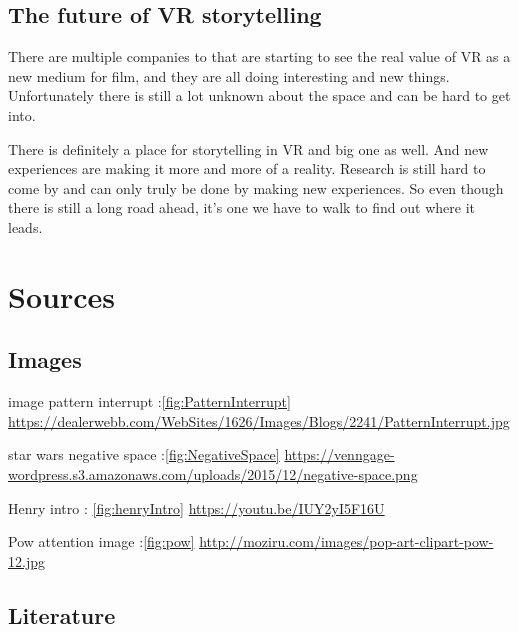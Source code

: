 \documentclass{report}
\begin{document}
				
				\section{The future of VR storytelling}
				
				There are multiple companies to that are starting to see the real value of VR as a new medium for film, and they are all doing interesting and new things. Unfortunately there is still a lot unknown about the space and can be hard to get into.
				 				
				There is definitely a place for storytelling in VR and big one as well. And new experiences are making it more and more of a reality. Research is still hard to come by and can only truly be done by making new experiences. So even though there is still a long road ahead, it's one we have to walk to find out where it leads.
				
				\chapter{Sources}
				
				\section{Images}
				
				
				image pattern interrupt :\ref{fig:PatternInterrupt} \href{https://dealerwebb.com/WebSites/1626/Images/Blogs/2241/PatternInterrupt.jpg}{https://dealerwebb.com/WebSites/1626/Images/Blogs/2241/PatternInterrupt.jpg}
				
				star wars negative space :\ref{fig:NegativeSpace} \href{https://venngage-wordpress.s3.amazonaws.com/uploads/2015/12/negative-space.png}{https://venngage-wordpress.s3.amazonaws.com/uploads/2015/12/negative-space.png}
				
				Henry intro : \ref{fig:henryIntro} \href{https://youtu.be/IUY2yI5F16U}{https://youtu.be/IUY2yI5F16U}
				
				Pow attention image :\ref{fig:pow}
				\href{http://moziru.com/images/pop-art-clipart-pow-12.jpg}{http://moziru.com/images/pop-art-clipart-pow-12.jpg}
				
				\section{Literature}
				
				
				
		
\end{document}

